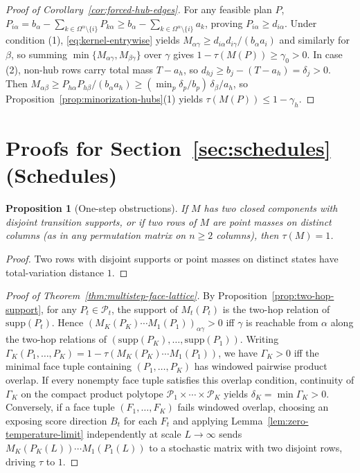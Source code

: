 \documentclass[10pt]{article}
\newtheorem{proposition}{Proposition}
\newcommand{\supp}{\mathrm{supp}}
\begin{document}
\begin{proof}[Proof of Corollary~\ref{cor:forced-hub-edges}]
For any feasible plan $P$, $P_{i\alpha} = b_\alpha - \sum_{k \in \Omega^\alpha \setminus \{i\}} P_{k\alpha} \ge b_\alpha - \sum_{k \in \Omega^\alpha \setminus \{i\}} a_k$, proving $P_{i\alpha} \ge d_{i\alpha}$. Under condition (1), \eqref{eq:kernel-entrywise} yields $M_{\alpha\gamma} \ge d_{i\alpha} d_{i\gamma}/(b_\alpha a_i)$ and similarly for $\beta$, so summing $\min\{M_{\alpha\gamma}, M_{\beta\gamma}\}$ over $\gamma$ gives $1 - \tau(M(P)) \ge \gamma_0 > 0$. In case (2), non-hub rows carry total mass $T - a_h$, so $d_{hj} \ge b_j - (T - a_h) = \delta_j > 0$. Then $M_{\alpha\beta} \ge P_{h\alpha} P_{h\beta}/(b_\alpha a_h) \ge (\min_p \delta_p/b_p)\, \delta_\beta / a_h$, so Proposition~\ref{prop:minorization-hubs}(1) yields $\tau(M(P)) \le 1 - \gamma_h$.
\end{proof}

\section{Proofs for Section~\ref{sec:schedules} (Schedules)}
\label{app:schedule-proofs}

\begin{proposition}[One-step obstructions]
\label{prop:one-step-obstructions}
If $M$ has two closed components with disjoint transition supports, or if two rows of $M$ are point masses on distinct columns (as in any permutation matrix on $n \ge 2$ columns), then $\tau(M) = 1$.
\end{proposition}

\begin{proof}
Two rows with disjoint supports or point masses on distinct states have total-variation distance $1$.
\end{proof}

\begin{proof}[Proof of Theorem~\ref{thm:multistep-face-lattice}]
By Proposition~\ref{prop:two-hop-support}, for any $P_t \in \mathcal{P}_t$, the support of $M_t(P_t)$ is the two-hop relation of $\supp(P_t)$. Hence $(M_K(P_K)\cdots M_1(P_1))_{\alpha\gamma} > 0$ iff $\gamma$ is reachable from $\alpha$ along the two-hop relations of $(\supp(P_K), \dots, \supp(P_1))$. Writing $\Gamma_K(P_1,\dots,P_K) = 1 - \tau(M_K(P_K)\cdots M_1(P_1))$, we have $\Gamma_K > 0$ iff the minimal face tuple containing $(P_1,\dots,P_K)$ has windowed pairwise product overlap. If every nonempty face tuple satisfies this overlap condition, continuity of $\Gamma_K$ on the compact product polytope $\mathcal{P}_1 \times \cdots \times \mathcal{P}_K$ yields $\delta_K = \min \Gamma_K > 0$. Conversely, if a face tuple $(F_1, \dots, F_K)$ fails windowed overlap, choosing an exposing score direction $B_t$ for each $F_t$ and applying Lemma~\ref{lem:zero-temperature-limit} independently at scale $L \to \infty$ sends $M_K(P_K(L))\cdots M_1(P_1(L))$ to a stochastic matrix with two disjoint rows, driving $\tau$ to $1$.
\end{proof}
\end{document}
